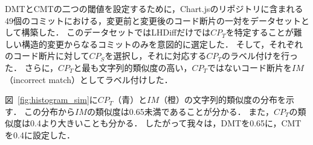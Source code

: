 DMTとCMTの二つの閾値を設定するために，Chart.jsのリポジトリに含まれる49個のコミットにおける，変更前と変更後のコード断片の一対をデータセットとして構築した．
このデータセットではLHDiffだけでは$CP_{T}$を特定することが難しい構造的変更からなるコミットのみを意図的に選定した．
そして，それぞれのコード断片に対して$CP_S$を選択し，それに対応する$CP_T$のラベル付けを行った．
さらに，$CP_T$と最も文字列的類似度の高い，$CP_T$ではないコード断片を$IM$（incorrect match）としてラベル付けした．



図~\ref{fig:histogram_sim}に$CP_T$（青）と$IM$（橙）の文字列的類似度の分布を示す．
この分布から$IM$の類似度は0.65未満であることが分かる．
また，$CP_T$の類似度は0.4より大きいことも分かる．
したがって我々は，DMTを0.65に，CMTを0.4に設定した．





